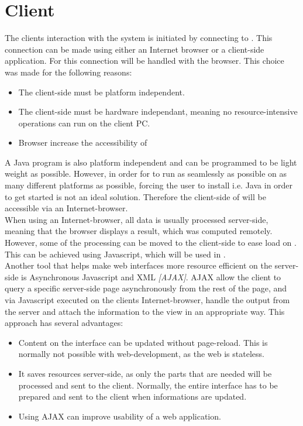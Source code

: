
\section{Client}\label{sec:design_client}
The clients interaction with the system is initiated by connecting to .
This connection can be made using either an Internet browser or a client-side application.
For \projectname{} this connection will be handled with the browser.
This choice was made for the following reasons:

\begin{itemize}
	\item The client-side must be platform independent.
	\item The client-side must be hardware independant, meaning no resource-intensive operations can run on the client PC.
	\item Browser increase the accessibility of \projectname{}
\end{itemize}

A Java program is also platform independent and can be programmed to be light weight as possible. 
However, in order for \projectname{} to run as seamlessly as possible on as many different platforms as possible, forcing the user to install i.e. Java in order to get started is not an ideal solution.
Therefore the client-side of \projectname{} will be accessible via an Internet-browser. \\

When using an Internet-browser, all data is usually processed server-side, meaning that the browser displays a result, which was computed remotely. 
However, some of the processing can be moved to the client-side to ease load on . 
This can be achieved using Javascript, which will be used in \projectname{}. \\

Another tool that helps make web interfaces more resource efficient on the server-side is Asynchronous Javascript and XML \emph{[AJAX]}. 
AJAX allow the client to query a specific server-side page asynchronously from the rest of the page, and via Javascript executed on the clients Internet-browser, handle the output from the server and attach the information to the view in an appropriate way. 
This approach has several advantages:

\begin{itemize}
	\item Content on the interface can be updated without page-reload. This is normally not possible with web-development, as the web is stateless.
	\item It saves resources server-side, as only the parts that are needed will be processed and sent to the client. Normally, the entire interface has to be prepared and sent to the client when informations are updated.
	\item Using AJAX can improve usability of a web application.
\end{itemize}

